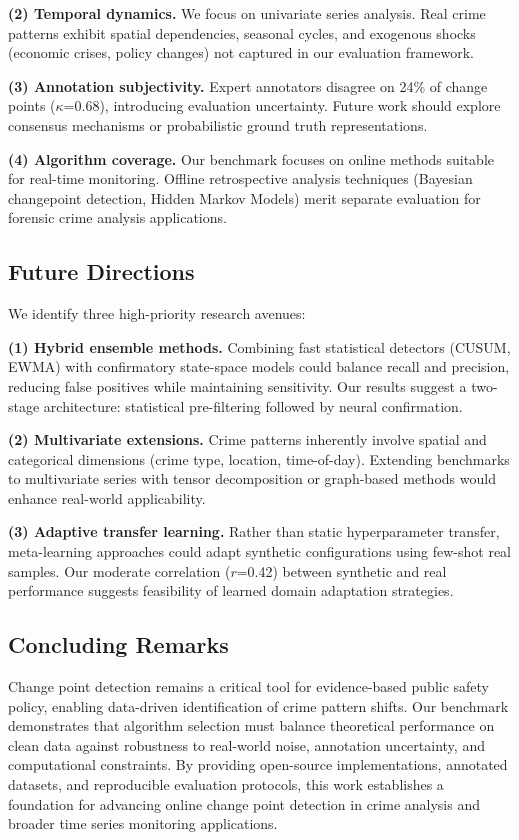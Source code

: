 \textbf{(2) Temporal dynamics.} We focus on univariate series analysis. Real crime patterns exhibit spatial dependencies, seasonal cycles, and exogenous shocks (economic crises, policy changes) not captured in our evaluation framework.

\textbf{(3) Annotation subjectivity.} Expert annotators disagree on 24\% of change points ($\kappa$=0.68), introducing evaluation uncertainty. Future work should explore consensus mechanisms or probabilistic ground truth representations.

\textbf{(4) Algorithm coverage.} Our benchmark focuses on online methods suitable for real-time monitoring. Offline retrospective analysis techniques (Bayesian changepoint detection, Hidden Markov Models) merit separate evaluation for forensic crime analysis applications.


\subsection{Future Directions}

We identify three high-priority research avenues:

\textbf{(1) Hybrid ensemble methods.} Combining fast statistical detectors (CUSUM, EWMA) with confirmatory state-space models could balance recall and precision, reducing false positives while maintaining sensitivity. Our results suggest a two-stage architecture: statistical pre-filtering followed by neural confirmation.

\textbf{(2) Multivariate extensions.} Crime patterns inherently involve spatial and categorical dimensions (crime type, location, time-of-day). Extending benchmarks to multivariate series with tensor decomposition or graph-based methods would enhance real-world applicability.

\textbf{(3) Adaptive transfer learning.} Rather than static hyperparameter transfer, meta-learning approaches could adapt synthetic configurations using few-shot real samples. Our moderate correlation ($r$=0.42) between synthetic and real performance suggests feasibility of learned domain adaptation strategies.


\subsection{Concluding Remarks}

Change point detection remains a critical tool for evidence-based public safety policy, enabling data-driven identification of crime pattern shifts. Our benchmark demonstrates that algorithm selection must balance theoretical performance on clean data against robustness to real-world noise, annotation uncertainty, and computational constraints. By providing open-source implementations, annotated datasets, and reproducible evaluation protocols, this work establishes a foundation for advancing online change point detection in crime analysis and broader time series monitoring applications.

